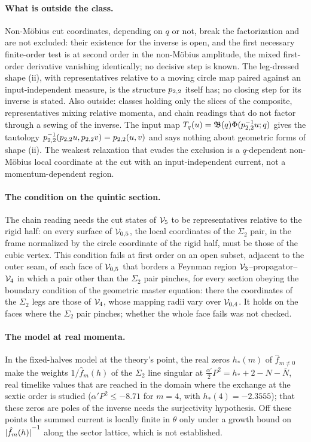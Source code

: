 \paragraph{What is outside the class.}
Non-Möbius cut coordinates, depending on $q$ or not, break the factorization and are not excluded: their existence for the inverse is open, and the first necessary finite-order test is at second order in the non-Möbius amplitude, the mixed first-order derivative vanishing identically; no decisive step is known.
The leg-dressed shape (ii), with representatives relative to a moving circle map paired against an input-independent measure, is the structure $p_{2,2}$ itself has; no closing step for its inverse is stated.
Also outside: classes holding only the slices of the composite, representatives mixing relative momenta, and chain readings that do not factor through a sewing of the inverse.
The input map $T_q(u) = \mathfrak B(q) \Phi(p_{2,2}^{-1} u; q)$ gives the tautology $p_{2,2}^{-1}(p_{2,2} u, p_{2,2} v) = p_{2,2}(u, v)$ and says nothing about geometric forms of shape (ii).
The weakest relaxation that evades the exclusion is a $q$-dependent non-Möbius local coordinate at the cut with an input-independent current, not a momentum-dependent region.

\paragraph{The condition on the quintic section.}
The chain reading needs the cut states of $\mathcal{V}_{5}$ to be representatives relative to the rigid half: on every surface of ${\mathcal{V}}_{0, 5}$, the local coordinates of the $\Sigma_2$ pair, in the frame normalized by the circle coordinate of the rigid half, must be those of the cubic vertex.
This condition fails at first order on an open subset, adjacent to the outer seam, of each face of ${\mathcal{V}}_{0, 5}$ that borders a Feynman region $\mathcal{V}_{3}$--propagator--$\mathcal{V}_{4}$ in which a pair other than the $\Sigma_2$ pair pinches, for every section obeying the boundary condition of the geometric master equation: there the coordinates of the $\Sigma_2$ legs are those of $\mathcal{V}_{4}$, whose mapping radii vary over ${\mathcal{V}}_{0, 4}$.
It holds on the faces where the $\Sigma_2$ pair pinches; whether the whole face fails was not checked.

\paragraph{The model at real momenta.}
In the fixed-halves model at the theory's point, the real zeros $h_*(m)$ of $\hat f_{m \neq 0}$ make the weights $1 / \hat f_m(h)$ of the $\Sigma_2$ line singular at $\tfrac{\alpha'}{2} P^2 = h_* + 2 - N - \bar N$, real timelike values that are reached in the domain where the exchange at the sextic order is studied ($\alpha' P^2 \le - 8.71$ for $m = 4$, with $h_*(4) = - 2.3555$); that these zeros are poles of the inverse needs the surjectivity hypothesis.
Off these points the summed current is locally finite in $\theta$ only under a growth bound on ${|\hat f_m(h)|}^{-1}$ along the sector lattice, which is not established.

